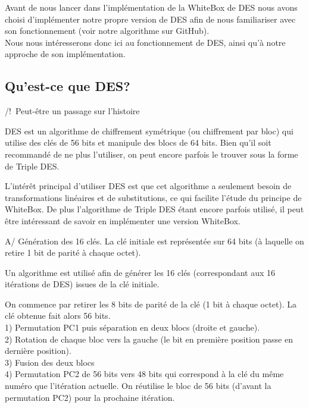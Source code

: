 \documentclass[a4paper,12pt]{article}
\begin{document}
Avant de nous lancer dans l'implémentation de la WhiteBox de DES nous avons choisi d'implémenter notre propre version de DES afin de nous familiariser avec son fonctionnement (voir notre algorithme sur GitHub). \\
	Nous nous intéresserons donc ici au fonctionnement de DES, ainsi qu'à notre approche de son implémentation.

\subsection{Qu'est-ce que DES?}

/!\ Peut-être un passage sur l'histoire

	DES est un algorithme de chiffrement symétrique (ou chiffrement par bloc) qui utilise des clés de 56 bits et manipule des blocs de 64 bits. Bien qu'il soit recommandé de ne plus l'utiliser, on peut encore parfois le trouver sous la forme de Triple DES.
	
	L'intérêt principal d'utiliser DES est que cet algorithme a seulement besoin de transformations linéaires et de substitutions, ce qui facilite l'étude du principe de WhiteBox. De plus l'algorithme de Triple DES étant encore parfois utilisé, il peut être intéressant de savoir en implémenter une version WhiteBox. 
	
A/ Génération des 16 clés. La clé initiale est représentée sur 64 bits (à laquelle on retire 1 bit de parité à chaque octet). 

	Un algorithme est utilisé afin de générer les 16 clés (correspondant aux 16 itérations de DES) issues de la clé initiale. 
	
	On commence par retirer les 8 bits de parité de la clé (1 bit à chaque octet). La clé obtenue fait alors 56 bits. \\
1) Permutation PC1 puis séparation en deux blocs (droite et gauche). \\
2) Rotation de chaque bloc vers la gauche (le bit en première position passe en dernière position). \\
3) Fusion des deux blocs \\
4) Permutation PC2 de 56 bits vers 48 bits qui correspond à la clé du même numéro que l'itération actuelle. On réutilise le bloc de 56 bits (d'avant la permutation PC2) pour la prochaine itération. \\
\end{document}
